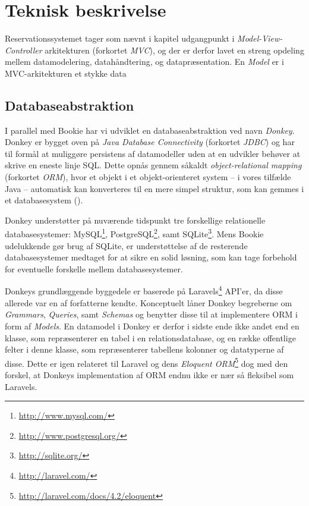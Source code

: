 \chapter{Teknisk beskrivelse}

Reservationssystemet tager som nævnt i kapitel udgangpunkt i \textit{Model-View-Controller} arkitekturen (forkortet \textit{MVC}), og der er derfor lavet en streng opdeling mellem datamodelering, datahåndtering, og datapræsentation. En \textit{Model} er i MVC-arkitekturen et stykke data

\section{Databaseabstraktion}

I parallel med Bookie har vi udviklet en databaseabstraktion ved navn \textit{Donkey}. Donkey er bygget oven på \textit{Java Database Connectivity} (forkortet \textit{JDBC}) og har til formål at muliggøre persistens af datamodeller uden at en udvikler behøver at skrive en eneste linje SQL. Dette opnås gennem såkaldt \textit{object-relational mapping} (forkortet \textit{ORM}), hvor et objekt i et objekt-orienteret system – i vores tilfælde Java – automatisk kan konverteres til en mere simpel struktur, som kan gemmes i et databasesystem (\cite{wiki:orm}).

Donkey understøtter på nuværende tidspunkt tre forskellige relationelle databasesystemer: MySQL\footnote{\url{http://www.mysql.com/}}, PostgreSQL\footnote{\url{http://www.postgresql.org/}}, samt SQLite\footnote{\url{http://sqlite.org/}}. Mens Bookie udelukkende gør brug af SQLite, er understøttelse af de resterende databasesystemer medtaget for at sikre en solid løsning, som kan tage forbehold for eventuelle forskelle mellem databasesystemer.

Donkeys grundlæggende byggedele er baserede på Laravels\footnote{\url{http://laravel.com/}} API'er, da disse allerede var en af forfatterne kendte. Konceptuelt låner Donkey begreberne om \textit{Grammars}, \textit{Queries}, samt \textit{Schemas} og benytter disse til at implementere ORM i form af \textit{Models}. En datamodel i Donkey er derfor i sidste ende ikke andet end en klasse, som repræsenterer en tabel i en relationsdatabase, og en række offentlige felter i denne klasse, som repræsenterer tabellens kolonner og datatyperne af disse. Dette er igen relateret til Laravel og dens \textit{Eloquent ORM}\footnote{\url{http://laravel.com/docs/4.2/eloquent}} dog med den forskel, at Donkeys implementation af ORM endnu ikke er nær så fleksibel som Laravels.

